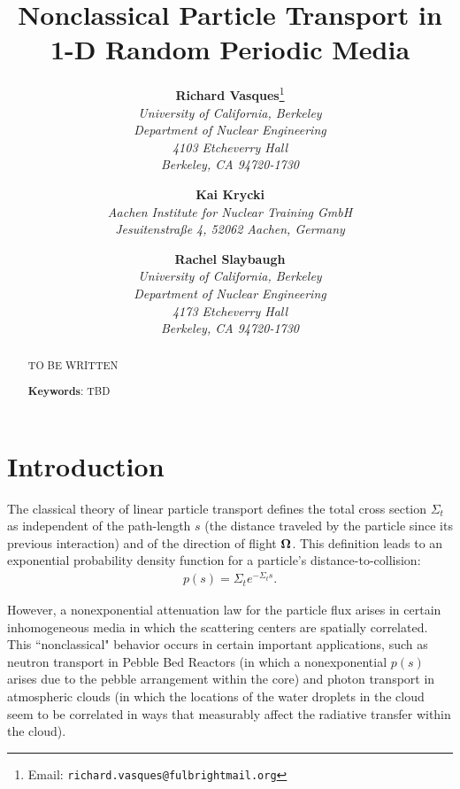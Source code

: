\documentclass[12pt]{article}
\newcommand{\uomega}{{\bf \Omega}}
\newcommand{\Keywords}[1]{\vspace{12pt}\par\noindent
{\small{\bf Keywords\/}: #1}}
\begin{document}
\title{Nonclassical Particle Transport in 1-D Random Periodic Media}
\author{{\bf Richard Vasques}\footnote{Email: \texttt{richard.vasques@fulbrightmail.org}}\\
\em University of California, Berkeley\\
\em Department of Nuclear Engineering\\
\em 4103 Etcheverry Hall\\
\em Berkeley, CA 94720-1730 \\
\and {\bf Kai Krycki} \\
\em Aachen Institute for Nuclear Training GmbH \\
\em Jesuitenstraße 4, 52062 Aachen, Germany\\
\and {\bf Rachel Slaybaugh}\\
\em University of California, Berkeley\\
\em Department of Nuclear Engineering\\
\em 4173 Etcheverry Hall\\
\em Berkeley, CA 94720-1730}
\date{}
\maketitle

\begin{abstract}

TO BE WRITTEN

\Keywords{TBD}
\end{abstract}

\pagebreak

\doublespacing

\section{Introduction}

The classical theory of linear particle transport defines the total cross section $\Sigma_t$ as independent of the path-length $s$ (the distance traveled by the particle since its previous interaction) and of the direction of flight $\uomega$.
This definition leads to an exponential probability density function for a particle's distance-to-collision:
\begin{align}\label{eq1}
p(s) = \Sigma_t e^{-\Sigma_t s}.
\end{align}

However, a nonexponential attenuation law for the particle flux arises in certain inhomogeneous media in which the scattering centers are spatially correlated.
This ``nonclassical" behavior occurs in certain important applications, such as neutron transport in Pebble Bed Reactors (in which a nonexponential $p(s)$ arises due to the pebble arrangement within the core) and photon transport in atmospheric clouds (in which the locations of the water droplets in the cloud seem to be correlated in ways that measurably affect the radiative transfer within the cloud).
\end{document}
